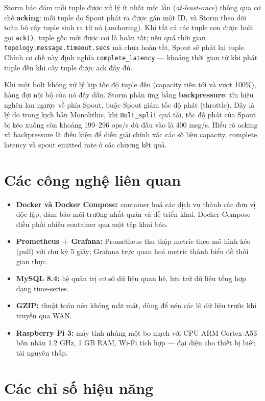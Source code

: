 \documentclass[13pt,a4paper]{report}
\newcommand{\code}[1]{\texttt{\small #1}}
\begin{document}
Storm bảo đảm mỗi tuple được xử lý ít nhất một lần (\textit{at-least-once}) thông
qua cơ chế \textbf{acking}: mỗi tuple do Spout phát ra được gán một ID, và Storm
theo dõi toàn bộ cây tuple sinh ra từ nó (anchoring). Khi tất cả các tuple con
được bolt gọi \code{ack()}, tuple gốc mới được coi là hoàn tất; nếu quá thời gian
\code{topology.message.timeout.secs} mà chưa hoàn tất, Spout sẽ phát lại tuple.
Chính cơ chế này định nghĩa \code{complete\_latency} --- khoảng thời gian từ khi
phát tuple đến khi cây tuple được ack đầy đủ.

Khi một bolt không xử lý kịp tốc độ tuple đến (capacity tiến tới và vượt 100\%),
hàng đợi nội bộ của nó đầy dần. Storm phản ứng bằng \textbf{backpressure}: tín
hiệu nghẽn lan ngược về phía Spout, buộc Spout giảm tốc độ phát (throttle). Đây
là lý do trong kịch bản Monolithic, khi \code{Bolt\_split} quá tải, tốc độ phát
của Spout bị kéo xuống còn khoảng 199--296 ops/s dù đầu vào là 400 msg/s. Hiểu rõ
acking và backpressure là điều kiện để diễn giải chính xác các số liệu capacity,
complete latency và spout emitted rate ở các chương kết quả.

\section{Các công nghệ liên quan}

\begin{itemize}
  \item \textbf{Docker và Docker Compose:} container hoá các dịch vụ thành các đơn
        vị độc lập, đảm bảo môi trường nhất quán và dễ triển khai. Docker Compose
        điều phối nhiều container qua một tệp khai báo.
  \item \textbf{Prometheus + Grafana:} Prometheus thu thập metric theo mô hình
        kéo (pull) với chu kỳ 5 giây; Grafana trực quan hoá metric thành biểu đồ
        thời gian thực.
  \item \textbf{MySQL 8.4:} hệ quản trị cơ sở dữ liệu quan hệ, lưu trữ dữ liệu
        tổng hợp dạng time-series.
  \item \textbf{GZIP:} thuật toán nén không mất mát, dùng để nén các lô dữ liệu
        trước khi truyền qua WAN.
  \item \textbf{Raspberry Pi 3:} máy tính nhúng một bo mạch với CPU ARM
        Cortex-A53 bốn nhân 1.2 GHz, 1 GB RAM, Wi-Fi tích hợp --- đại diện cho
        thiết bị biên tài nguyên thấp.
\end{itemize}

\section{Các chỉ số hiệu năng}
\end{document}
